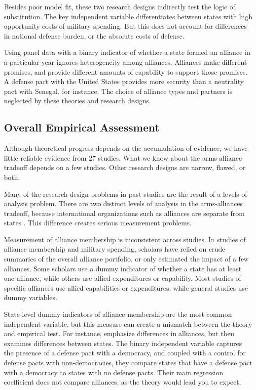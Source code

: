 \documentclass[12pt]{article}
\begin{document}
Besides poor model fit, these two research designs indirectly test the logic of substitution. The key independent variable differentiates between states with high opportunity costs of military spending. But this does not account for differences in national defense burden, or the absolute costs of defense.  
  
Using panel data with a binary indicator of whether a state formed an alliance in a particular year ignores heterogeneity among alliances. Alliances make different promises, and provide different amounts of capability to support those promises. A defense pact with the United States provides more security than a neutrality pact with Senegal, for instance. The choice of alliance types and partners is neglected by these theories and research designs.  


\subsection*{Overall Empirical Assessment}

Although theoretical progress depends on the accumulation of evidence, we have little reliable evidence from 27 studies. What we know about the arms-alliance tradeoff depends on a few studies. Other research designs are narrow, flawed, or both.  

Many of the research design problems in past studies are the result of a levels of analysis problem. There are two distinct levels of analysis in the arms-alliances tradeoff, because international organizations such as alliances are separate from states \citep{Mattes2012, Chibaetal2015}. This difference creates serious measurement problems. 

Measurement of alliance membership is inconsistent across studies. In studies of alliance membership and military spending, scholars have relied on crude summaries of the overall alliance portfolio, or only estimated the impact of a few alliances. Some scholars use a dummy indicator of whether a state has at least one alliance, while others use allied expenditures or capability. Most studies of specific alliances use allied capabilities or expenditures, while general studies use dummy variables. 

State-level dummy indicators of alliance membership are the most common independent variable, but this measure can create a mismatch between the theory and empirical test. For instance, \citet{DigiuseppePoast2016} emphasize differences in alliances, but then examines differences between states. The binary independent variable captures the presence of a defense pact with a democracy, and coupled with a control for defense pacts with non-democracies, they compare states that have a defense pact with a democracy to states with no defense pacts. Their main regression coefficient does not compare alliances, as the theory would lead you to expect. 
\end{document}
